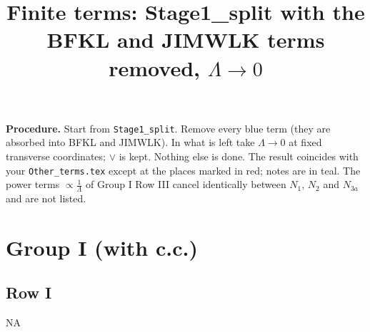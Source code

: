 \documentclass[9pt]{article}
\title{Finite terms: Stage1\_split with the BFKL and JIMWLK terms removed, $\Lambda\to0$}
\author{}
\date{}
\numberwithin{equation}{section}
\begin{document}
\maketitle
\noindent\textbf{Procedure.} Start from \texttt{Stage1\_split}. Remove every blue term (they are absorbed into BFKL and JIMWLK). In what is left take $\Lambda\to0$ at fixed transverse coordinates; $\vee$ is kept. Nothing else is done. The result coincides with your \texttt{Other\_terms.tex} except at the places marked in {\color{red}red}; notes are in {\color{teal}teal}. The power terms $\propto\frac{1}{\Lambda}$ of Group I Row III cancel identically between $N_{1}$, $N_{2}$ and $N_{3a}$ and are not listed.

\section{Group I (with c.c.)}
\subsection{Row I}
\textsc{NA}
\end{document}
